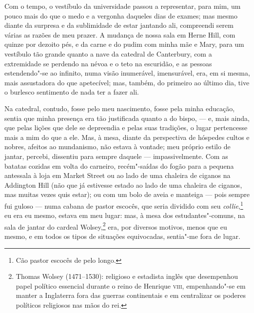 Com o tempo, o vestíbulo da universidade passou a representar, para
mim, um pouco mais do que o medo e a vergonha daqueles dias de exames;
mas mesmo diante da surpresa e da sublimidade de estar jantando ali,
compreendi serem várias as razões de meu prazer. A mudança de nossa sala
em Herne Hill, com quinze por dezoito pés, e da carne e do pudim com
minha mãe e Mary, para um vestíbulo tão grande quanto a nave da catedral
de Canterbury, com a extremidade se perdendo na névoa e o teto na
escuridão, e as pessoas estendendo"-se ao infinito, numa visão
inumerável, imensurável, era, em si mesma, mais assustadora do que
apetecível; mas, também, do primeiro ao último dia, tive o burlesco
sentimento de nada ter a fazer ali.

Na catedral, contudo, fosse pelo meu nascimento, fosse pela minha
educação, sentia que minha presença era tão justificada quanto a do
bispo, --- e, mais ainda, que pelas lições que dele se depreendia e pelas
suas tradições, o lugar pertencesse mais a mim do que a ele. Mas, à
mesa, diante da perspectiva de hóspedes cultos e nobres, afeitos ao
mundanismo, não estava à vontade; meu próprio estilo de jantar, percebi,
dissentiu para sempre daquele --- impassivelmente. Com as batatas cozidas
em volta do carneiro, recém"-saídas do fogão para a pequena antessala à
loja em Market Street ou ao lado de uma chaleira de ciganos na Addington
Hill (não que já estivesse estado ao lado de uma chaleira de ciganos,
mas muitas vezes quis estar); ou com um bolo de aveia e manteiga --- pois
sempre fui guloso --- numa cabana de pastor escocês, que seria dividido
com seu \textit{collie},\footnote{Cão pastor escocês de pelo longo.} eu era eu mesmo, estava em meu lugar: mas, à mesa dos
estudantes"-comuns, na sala de jantar do cardeal Wolsey,\footnote{Thomas
  Wolsey (1471--1530): religioso e estadista inglês que desempenhou papel
  político essencial durante o reino de Henrique \textsc{viii}, empenhando"-se em
  manter a Inglaterra fora das guerras continentais e em centralizar os
  poderes políticos religiosos nas mãos do rei.} era,
por diversos motivos, menos que eu mesmo, e em todos os tipos de
situações equivocadas, sentia"-me fora de lugar.

